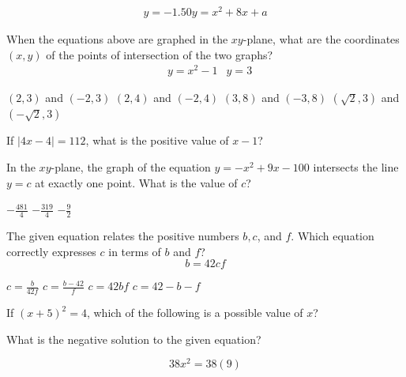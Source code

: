 \[
\begin{gathered}
y=-1.50 
y=x^{2}+8 x+a
\end{gathered}
\]

\begin{solutionorbox}[1in]
\end{solutionorbox}

\question[1]
When the equations above are graphed in the $x y$-plane, what are the coordinates $(x, y)$ of the points of intersection of the two graphs?
\[
\begin{aligned}
& y=x^{2}-1 
& y=3
\end{aligned}
\]
\begin{choices}
  \CorrectChoice $(2,3)$ and $(-2,3)$
  \choice $(2,4)$ and $(-2,4)$
  \choice $(3,8)$ and $(-3,8)$
  \choice $(\sqrt{2}, 3)$ and $(-\sqrt{2}, 3)$
\end{choices}

\question[1]
If $|4 x-4|=112$, what is the positive value of $x-1$?

\begin{solutionorbox}[1in]
\end{solutionorbox}

\question[1]
In the $x y$-plane, the graph of the equation $y=-x^{2}+9 x-100$ intersects the line $y=c$ at exactly one point. What is the value of $c$?
\begin{choices}
  \choice $-\frac{481}{4}$
  \CorrectChoice $-\frac{319}{4}$
  \choice $-\frac{9}{2}$
\end{choices}

\question[1]
The given equation relates the positive numbers $b, c$, and $f$. Which equation correctly expresses $c$ in terms of $b$ and $f$?
\[
b=42 c f
\]
\begin{choices}
  \CorrectChoice $c=\frac{b}{42 f}$
  \choice $c=\frac{b-42}{f}$
  \choice $c=42 b f$
  \choice $c=42-b-f$
\end{choices}

\newpage

\question[1]
If $(x+5)^{2}=4$, which of the following is a possible value of $x$?
\begin{choices}
\end{choices}

\question[1]
What is the negative solution to the given equation?

\[
38 x^{2}=38(9)
\]

\begin{solutionorbox}[1in]
\end{solutionorbox}

